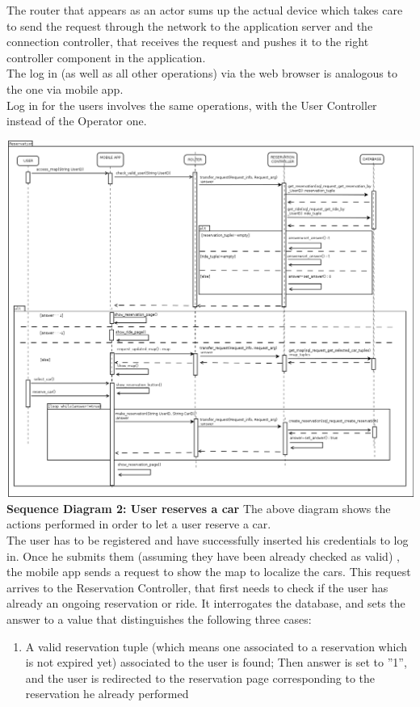 \documentclass{article}
\begin{document}
\begin{flushleft}
The router that appears as an actor sums up the actual device which takes care to send the request through the network to the application server and the connection controller, that receives the request and pushes it to the right controller component in the application.\\
The log in (as well as all other operations) via the web browser is analogous to the one via mobile app.\\
Log in for the users involves the same operations, with the User Controller instead of the Operator one.



\newpage
\includegraphics[scale=0.3]{seq2_reservation} 
\newpage
\textbf{Sequence Diagram 2: User reserves a car}
\break
The above diagram shows the actions performed in order to let a user reserve a car. \\
The user has to be registered and have successfully inserted his credentials to log in. Once he submits them (assuming they have been already checked as valid) , the mobile app sends a request to show the map to localize the cars. This request arrives to the Reservation Controller, that first needs to check if the user has already an ongoing reservation or ride. It interrogates the database, and sets the answer to a value that distinguishes the following three cases:
\begin{enumerate}
\item A valid reservation tuple (which means one associated to a reservation which is not expired yet) associated to the user is found; Then answer is set to ''1'', and the user is redirected to the reservation page corresponding to the reservation he already performed

\end{enumerate}
\end{flushleft}
\end{document}

